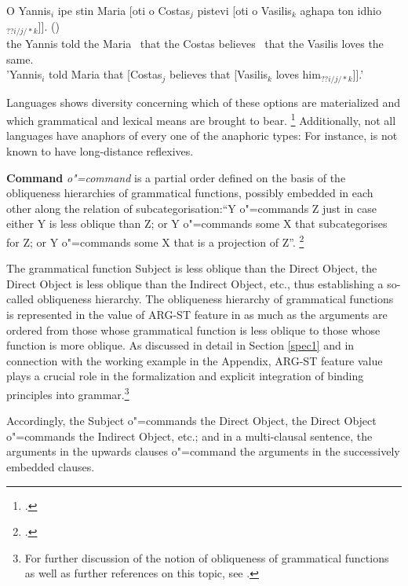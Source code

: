 \documentclass[output=paper
,modfonts
,nonflat]{langsci/langscibook}
\begin{document}
\enlargethispage*{2mm}

\begin{exe}
\ex
\gll O Yannis$_{i}$ ipe stin Maria [oti o Costas$_{j}$ pistevi [oti o Vasilis$_{k}$ aghapa ton
idhio$_{??i/j/*k}$]]. ()
\\ 
the Yannis told the Maria \mbox{ }that the Costas believes \mbox{ }that the Vasilis loves the same.\\
\trans 'Yannis$_{i}$ told Maria that [Costas$_{j}$ believes that [Vasilis$_{k}$ loves
him$_{??i/j/*k}$]].'
\end{exe}

Languages shows diversity concerning which of these options are materialized
and which grammatical and lexical means are brought to bear.%
\footnote{
\citep{dimitriadisDatabase:2005}.
}
Additionally, not all languages have anaphors of every one of the anaphoric types:
For instance,  is not known to have long-distance reflexives.

	
{\bf Command} {\em o"=command} is a partial order defined on the basis of the obliqueness hierarchies
of grammatical functions, possibly embedded in each other along the relation of
subcategorisation:``Y o"=commands Z just in case either Y is less
oblique than Z; or Y {\mbox o"=commands} some X that subcategorises for Z; or Y
o"=commands some X that is a projection of Z''.%
\footnote{\citep[]{polsag:hpsg94}.}

The grammatical function Subject is less oblique than the Direct Object, the Direct
Object is less oblique than the Indirect Object, etc., thus establishing a so-called obliqueness hierarchy. 
The obliqueness hierarchy
of grammatical functions is represented in the value of ARG-ST feature in as much as 
the arguments are ordered from those whose grammatical function is less oblique to those 
whose function is more oblique.
As discussed in detail in Section \ref{spec1} and in connection with the working example 
in the Appendix, ARG-ST feature value plays a crucial role in the formalization
and explicit integration of binding principles into grammar.\footnote{
For further discussion of the notion of obliqueness of grammatical functions as well as further references on
this topic, see \citep[Section~5.2]{polsag:hpsg87}.}

Accordingly, the Subject o"=commands the Direct Object, the Direct
Object o"=commands the Indirect Object, etc.;
and in a multi-clausal sentence,
the arguments in the upwards clauses o"=command the arguments in the
successively embedded clauses.
\end{document}
